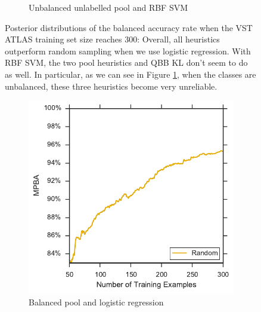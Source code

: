 \begin{figure}[p]
\begin{subfigure}{\textwidth}
		\caption{Unbalanced unlabelled pool and RBF SVM}
		\label{fig:vstatlas_ur_ind_violin}
	\end{subfigure}
	\caption[Violin plots of balanced accuracy rate (VST ATLAS)]{
		Posterior distributions of the balanced accuracy rate when the VST ATLAS training set size reaches 300: Overall, all heuristics outperform random sampling when we use logistic regression. With RBF SVM, the two pool heuristics and QBB KL don't seem to do as well.
		In particular, as we can see in Figure \ref{fig:vstatlas_ur_ind_violin}, when the classes are unbalanced, these three heuristics become very unreliable.}
	\label{fig:vstatlas_bl_ind}
\end{figure}


\begin{figure}[p]
	\centering
	\begin{subfigure}{.5\textwidth}
		\centering
		\includegraphics[width=\textwidth]{figures/5_active/vstatlas_bl_ind_lower}
		\caption{Balanced pool and logistic regression}
		\label{fig:vstatlas_bl_ind_lower}
	\end{subfigure}%
	\begin{subfigure}{.5\textwidth}
		\centering

\end{subfigure}
\end{figure}
